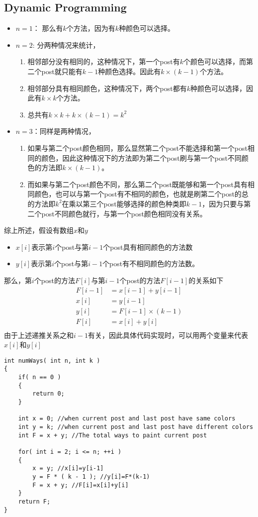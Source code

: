 \subsection{Dynamic Programming}
\begin{itemize}
\item $n=1$： 那么有$k$个方法，因为有$k$种颜色可以选择。
\item $n=2$: 分两种情况来统计，
\begin{enumerate}
\item 相邻部分没有相同的，这种情况下，第一个post有$k$个颜色可以选择，而第二个post就只能有$k-1$种颜色选择。因此有$k\times (k-1)$个方法。
\item 相邻部分具有相同颜色，这种情况下，两个post都有$k$种颜色可以选择，因此有$k\times k$个方法。
\item 总共有$k\times k+k\times(k-1) = k^2$
\end{enumerate}
\item $n=3$：同样是两种情况，\begin{enumerate}
\item 如果与第二个post颜色相同，那么显然第二个post不能选择和第一个post相同的颜色，因此这种情况下的方法即为第二个post刷与第一个post不同颜色的方法即$k\times(k-1)$。
\item 而如果与第二个post颜色不同，那么第二个post既能够和第一个post具有相同颜色，也可以与第一个post有不相同的颜色，也就是刷第二个post的总的方法即$k^2$在乘以第三个post能够选择的颜色种类即$k-1$，因为只要与第二个post不同颜色就行，与第一个post颜色相同没有关系。
\end{enumerate}
\end{itemize}
综上所述，假设有数组$x$和$y$
\begin{itemize}
\item $x[i]$表示第$i$个post与第$i-1$个post具有相同颜色的方法数
\item $y[i]$表示第$i$个post与第$i-1$个post有不相同颜色的方法数。
\end{itemize}
那么，第$i$个post的方法$F[i]$与第$i-1$个post的方法$F[i-1]$的关系如下
\begin{align*}
F[i-1] &= x[i-1] + y[i-1]\\
x[i] &= y[i-1]\\
y[i] &= F[i-1]\times(k-1)\\
F[i] &= x[i] + y[i]\\
\end{align*}
由于上述递推关系之和$i-1$有关，因此具体代码实现时，可以用两个变量来代表$x[i]$和$y[i]$

\setcounter{lstlisting}{0}
\begin{lstlisting}[style=customc, caption={Dynamic Programming}]
int numWays( int n, int k )
{
    if( n == 0 )
    {
        return 0;
    }

    int x = 0; //when current post and last post have same colors
    int y = k; //when current post and last post have different colors
    int F = x + y; //The total ways to paint current post

    for( int i = 2; i <= n; ++i )
    {
        x = y; //x[i]=y[i-1]
        y = F * ( k - 1 ); //y[i]=F*(k-1)
        F = x + y; //F[i]=x[i]+y[i]
    }
    return F;
}
\end{lstlisting}